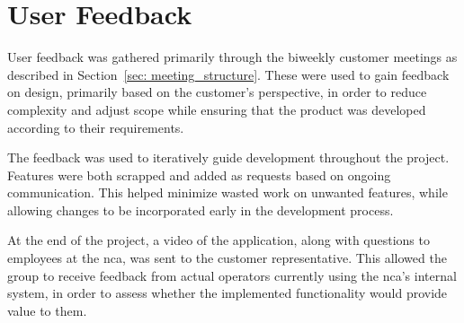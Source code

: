 \section{User Feedback}
\label{sec:user_feedback}
User feedback was gathered primarily through the biweekly customer meetings as described in Section~\ref{sec: meeting_structure}. These were used to gain feedback on design, primarily based on the customer's perspective, in order to reduce complexity and adjust scope while ensuring that the product was developed according to their requirements.

The feedback was used to iteratively guide development throughout the project. Features were both scrapped and added as requests based on ongoing communication. This helped minimize wasted work on unwanted features, while allowing changes to be incorporated early in the development process.

At the end of the project, a video of the application, along with questions to employees at the \acrshort{nca}, was sent to the customer representative. This allowed the group to receive feedback from actual operators currently using the \acrshort{nca}'s internal system, in order to assess whether the implemented functionality would provide value to them.
% 
